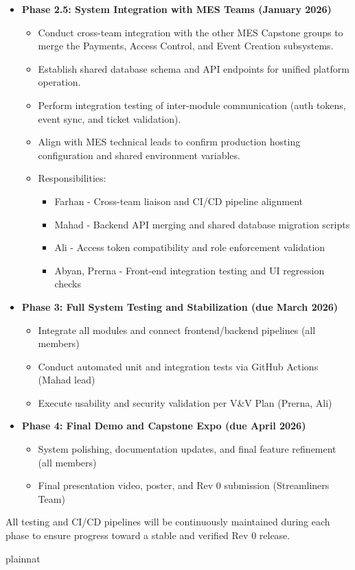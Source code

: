 \documentclass[12pt, titlepage]{article}
\begin{document}
\begin{itemize}
    \item \textbf{Phase 2.5: System Integration with MES Teams (January 2026)}  
    \begin{itemize}
        \item Conduct cross-team integration with the other MES Capstone groups to merge the Payments, Access Control, and Event Creation subsystems.  
        \item Establish shared database schema and API endpoints for unified platform operation.  
        \item Perform integration testing of inter-module communication (auth tokens, event sync, and ticket validation).  
        \item Align with MES technical leads to confirm production hosting configuration and shared environment variables.  
        \item Responsibilities:  
        \begin{itemize}
            \item Farhan - Cross-team liaison and CI/CD pipeline alignment  
            \item Mahad - Backend API merging and shared database migration scripts  
            \item Ali - Access token compatibility and role enforcement validation  
            \item Abyan, Prerna - Front-end integration testing and UI regression checks
        \end{itemize}
    \end{itemize}

    \item \textbf{Phase 3: Full System Testing and Stabilization (due March 2026)}  
    \begin{itemize}
        \item Integrate all modules and connect frontend/backend pipelines (all members)  
        \item Conduct automated unit and integration tests via GitHub Actions (Mahad lead)  
        \item Execute usability and security validation per V\&V Plan (Prerna, Ali)
    \end{itemize}

    \item \textbf{Phase 4: Final Demo and Capstone Expo (due April 2026)}  
    \begin{itemize}
        \item System polishing, documentation updates, and final feature refinement (all members)  
        \item Final presentation video, poster, and Rev 0 submission (Streamliners Team)
    \end{itemize}
\end{itemize}

\noindent
All testing and CI/CD pipelines will be continuously maintained during each phase to ensure
progress toward a stable and verified Rev 0 release.

 {plainnat}


\newpage{}
\end{document}
